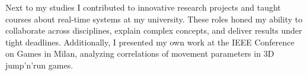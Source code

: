 Next to my studies I contributed to innovative research projects and taught courses about real-time systems
at my university. 
These roles honed my ability to collaborate across disciplines, explain complex concepts, 
and deliver results under tight deadlines. 
Additionally, I presented my own work at
the IEEE Conference on Games in Milan, analyzing correlations of movement parameters in 3D
jump’n’run games.